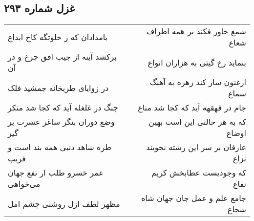 \begin{center}
\section*{غزل شماره ۲۹۳}
\label{sec:sh293}
\begin{longtable}{l p{0.5cm} r}
بامدادان که ز خلوتگه کاخ ابداع
&&
شمع خاور فکند بر همه اطراف شعاع
\\
برکشد آینه از جیب افق چرخ و در آن
&&
بنماید رخ گیتی به هزاران انواع
\\
در زوایای طربخانه جمشید فلک
&&
ارغنون ساز کند زهره به آهنگ سماع
\\
چنگ در غلغله آید که کجا شد منکر
&&
جام در قهقهه آید که کجا شد مناع
\\
وضع دوران بنگر ساغر عشرت بر گیر
&&
که به هر حالتی این است بهین اوضاع
\\
طره شاهد دنیی همه بند است و فریب
&&
عارفان بر سر این رشته نجویند نزاع
\\
عمر خسرو طلب ار نفع جهان می‌خواهی
&&
که وجودیست عطابخش کریم نفاع
\\
مظهر لطف ازل روشنی چشم امل
&&
جامع علم و عمل جان جهان شاه شجاع
\\
\end{longtable}
\end{center}
